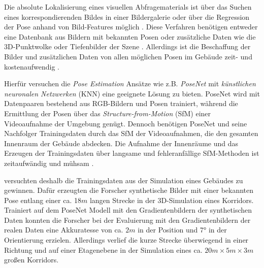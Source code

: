 Die absolute Lokalisierung eines visuellen Abfragematerials ist über das Suchen eines korrespondierenden Bildes in einer Bildergalerie oder über die Regression der Pose anhand von Bild-Features möglich \cite{piascoSurveyVisualBasedLocalization2018}. Diese Verfahren benötigen entweder eine Datenbank aus Bildern mit bekannten Posen \cite{zhangImageBasedLocalization2006, arandjelovicThreeThingsEveryone2012} oder zusätzliche Daten wie die 3D-Punktwolke \cite{irscharaStructurefrommotionPointClouds2009, liWorldwidePoseEstimation2012} oder Tiefenbilder der Szene \cite{shottonSceneCoordinateRegression2013}. Allerdings ist die Beschaffung der Bilder und zusätzlichen Daten von allen möglichen Posen im Gebäude zeit- und kostenaufwendig \cite{acharyaBIMPoseNetIndoorCamera2019}.


Hierfür versuchen die \textit{Pose Estimation} Ansätze wie z.B. \textit{PoseNet} \cite{kendallPoseNetConvolutionalNetwork2015} mit \textit{künstlichen neuronalen Netzwerken} (KNN) eine geeignete Lösung zu bieten. PoseNet wird mit Datenpaaren bestehend aus RGB-Bildern und Posen trainiert, während die Ermittlung der Posen über das \textit{Structure-from-Motion} (SfM) einer Videoaufnahme der Umgebung genügt. Dennoch benötigen PoseNet und seine Nachfolger \cite{kendallModellingUncertaintyDeep2016, walchImageBasedLocalizationUsing2017, kendallGeometricLossFunctions2017, clarkVidLocDeepSpatioTemporal2017} Trainingsdaten durch das SfM der Videoaufnahmen, die den gesamten Innenraum der Gebäude abdecken. Die Aufnahme der Innenräume und das Erzeugen der Trainingsdaten über langsame und fehleranfällige SfM-Methoden ist zeitaufwändig und mühsam \cite{acharyaBIMPoseNetIndoorCamera2019}.

\citet{acharyaBIMPoseNetIndoorCamera2019} versuchten deshalb die Trainingsdaten aus der Simulation eines Gebäudes zu gewinnen. Dafür erzeugten die Forscher synthetische Bilder mit einer bekannten Pose entlang einer ca. 18$m$ langen Strecke in der 3D-Simulation eines Korridors. Trainiert auf dem PoseNet Modell mit den Gradientenbildern der synthetischen Daten konnten die Forscher \citet{acharyaBIMPoseNetIndoorCamera2019} bei der Evaluierung mit den Gradientenbildern der realen Daten eine Akkuratesse von ca. $2m$ in der Position und 7° in der Orientierung erzielen. Allerdings verlief die kurze Strecke überwiegend in einer Richtung und auf einer Etagenebene in der Simulation eines ca. $20m \times 5m \times 3m$ großen Korridors.


